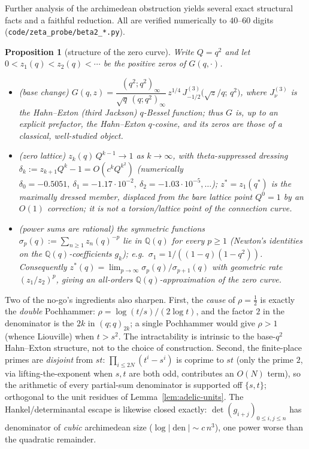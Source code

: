 \documentclass[11pt]{article}
\theoremstyle{plain}
\newtheorem{proposition}[theorem]{Proposition}
\theoremstyle{definition}
\theoremstyle{remark}
\newcommand{\Q}{\mathbb{Q}}
\begin{document}
Further analysis of the archimedean obstruction yields several exact structural facts and a faithful
reduction. All are verified numerically to $40$--$60$
digits (\texttt{code/zeta\_probe/beta2\_*.py}).

\begin{proposition}[structure of the zero curve]
\label{prop:zerostructure}
Write $Q=q^2$ and let $0<z_1(q)<z_2(q)<\cdots$ be the positive zeros of $G(q,\cdot)$.
\begin{itemize}
\item[\textup{(i)}] \textup{(base change)} $G(q,z)=\dfrac{(q^2;q^2)_\infty}{\sqrt q\,(q;q^2)_\infty}\,
z^{1/4}\,J^{(3)}_{-1/2}\!\bigl(\sqrt z/q;\,q^2\bigr)$, where $J^{(3)}_\nu$ is the Hahn--Exton (third
Jackson) $q$-Bessel function; thus $G$ is, up to an explicit prefactor, the \emph{Hahn--Exton
$q$-cosine}, and its zeros are those of a classical, well-studied object.
\item[\textup{(ii)}] \textup{(zero lattice)} $z_k(q)\,Q^{k-1}\to1$ as $k\to\infty$, with
theta-suppressed dressing $\delta_k:=z_{k+1}Q^{k}-1=O(c^{k}Q^{k^2})$ (numerically $\delta_0=-0.5051,\ \delta_1=-1.17\cdot
10^{-2},\ \delta_2=-1.03\cdot10^{-5},\dots$); $z^\ast=z_1(q^\ast)$ is the maximally dressed member,
displaced from the bare lattice point $Q^{0}=1$ by an $O(1)$ correction; it is \emph{not} a
torsion/lattice point of the connection curve.
\item[\textup{(iii)}] \textup{(power sums are rational)} the symmetric functions
$\sigma_p(q):=\sum_{n\ge1}z_n(q)^{-p}$ lie in $\Q(q)$ for every $p\ge1$ (Newton's identities on the
$\Q(q)$-coefficients $g_k$); e.g.\ $\sigma_1=1/((1-q)(1-q^2))$. Consequently
$z^\ast(q)=\lim_{p\to\infty}\sigma_p(q)/\sigma_{p+1}(q)$ with geometric rate $(z_1/z_2)^p$, giving an
all-orders $\Q(q)$-approximation of the zero curve.
\end{itemize}
\end{proposition}

Two of the no-go's ingredients also sharpen. First, the \emph{cause} of $\rho=\tfrac12$ is exactly the
\emph{double} Pochhammer: $\rho=\log(t/s)/(2\log t)$, and the factor $2$ in the denominator is the
$2k$ in $(q;q)_{2k}$; a single Pochhammer would give $\rho>1$ (whence Liouville) when $t>s^2$. The
intractability is intrinsic to the base-$q^2$ Hahn--Exton structure, not to the choice of construction.
Second, the finite-place primes are \emph{disjoint} from $st$: $\prod_{i\le2N}(t^i-s^i)$ is coprime to
$st$ (only the prime $2$, via lifting-the-exponent when $s,t$ are both odd, contributes an $O(N)$ term),
so the arithmetic of every partial-sum denominator is supported off $\{s,t\}$; orthogonal to the
unit residues of Lemma~\ref{lem:adelic-units}. The Hankel/determinantal escape is likewise closed
exactly: $\det(g_{i+j})_{0\le i,j\le n}$ has denominator of \emph{cubic} archimedean size
($\log|\!\operatorname{den}|\sim c\,n^3$), one power worse than the quadratic remainder.
\end{document}
